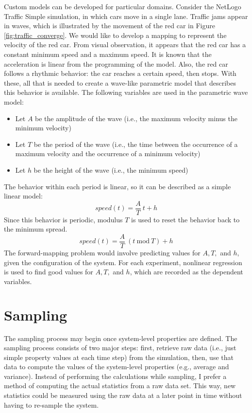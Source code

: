 Custom models can be developed for particular domains.
Consider the NetLogo Traffic Simple simulation, in which cars move in a single lane.
Traffic jams appear in waves, which is illustrated by the movement of the red car in Figure \ref{fig:traffic_converge}.
We would like to develop a mapping to represent the velocity of the red car.
From visual observation, it appears that the red car has a constant minimum speed and a maximum speed.
It is known that the acceleration is linear from the programming of the model.
Also, the red car follows a rhythmic behavior: the car reaches a certain speed, then stops.
 With these, all that is needed to create a wave-like parametric model that describes this behavior is available.
 The following variables are used in the parametric wave model:
\begin{itemize}
  \item Let $A$ be the amplitude of the wave (i.e., the maximum velocity minus the minimum velocity)
  \item Let $T$ be the period of the wave (i.e., the time between the occurrence of a maximum velocity and the occurrence of a minimum velocity)
  \item Let $h$ be the height of the wave (i.e., the minimum speed)
\end{itemize}
The behavior within each period is linear, so it can be described as a simple linear model:
   \[speed(t) = \displaystyle \frac{A}{T} ~{} t + h\]
Since this behavior is periodic, modulus $T$ is used to reset the behavior back to the minimum spread.
   \[speed(t) = \displaystyle \frac{A}{T} ~{} (t~{}\mathrm{mod}~{} T) + h \]
The forward-mapping problem would involve predicting values for $A, T,$ and $h$, given the configuration of the system.
For each experiment, nonlinear regression is used to find good values for $A, T,$ and $h$, which are recorded as the dependent variables.



\section{Sampling}
The sampling process may begin once system-level properties are defined.
The \fw sampling process consists of two major steps:
first, retrieve raw data (i.e., just simple property values at each time step) from the simulation, then, use that data to compute the values of the system-level properties (e.g., average and variance).
Instead of performing the calculations while sampling, I prefer a method of computing the actual statistics from a raw data set.
This way, new statistics could be measured using the raw data at a later point in time without having to re-sample the system.


